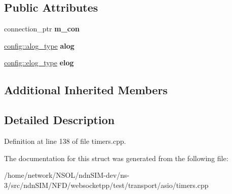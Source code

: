 \subsection*{Public Attributes}
\begin{DoxyCompactItemize}
\item 
connection\+\_\+ptr {\bfseries m\+\_\+con}\hypertarget{structmock__endpoint_a5ba0b312d46374e7fd08ccd7d7b6f822}{}\label{structmock__endpoint_a5ba0b312d46374e7fd08ccd7d7b6f822}

\item 
\hyperlink{classwebsocketpp_1_1log_1_1stub}{config\+::alog\+\_\+type} {\bfseries alog}\hypertarget{structmock__endpoint_a432a9a06304d34f4164284283bbff708}{}\label{structmock__endpoint_a432a9a06304d34f4164284283bbff708}

\item 
\hyperlink{classwebsocketpp_1_1log_1_1stub}{config\+::elog\+\_\+type} {\bfseries elog}\hypertarget{structmock__endpoint_a59b61ec062e7f2e4a75af9fa2e1d3e64}{}\label{structmock__endpoint_a59b61ec062e7f2e4a75af9fa2e1d3e64}

\end{DoxyCompactItemize}
\subsection*{Additional Inherited Members}


\subsection{Detailed Description}


Definition at line 138 of file timers.\+cpp.



The documentation for this struct was generated from the following file\+:\begin{DoxyCompactItemize}
\item 
/home/network/\+N\+S\+O\+L/ndn\+S\+I\+M-\/dev/ns-\/3/src/ndn\+S\+I\+M/\+N\+F\+D/websocketpp/test/transport/asio/timers.\+cpp\end{DoxyCompactItemize}
